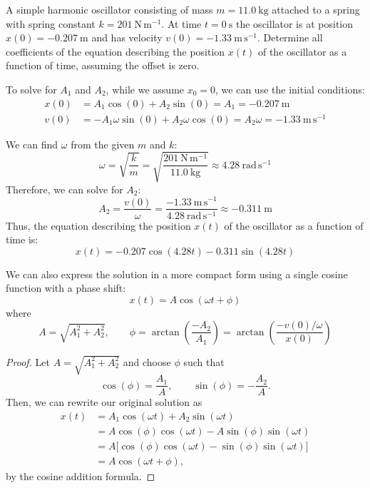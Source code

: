 \documentclass[11pt]{report}
\begin{document}
\begin{example}
    A simple harmonic oscillator consisting of mass \(m = 11.0\ \mathrm{kg}\) attached to a spring with spring constant \(k = 201\ \mathrm{N\,m^{-1}}\). At time \(t=0\ \mathrm{s}\) the oscillator is at position \(x(0) = -0.207\ \mathrm{m}\) and has velocity \(v(0) = -1.33\ \mathrm{m\,s^{-1}}\). Determine all coefficients of the equation describing the position \(x(t)\) of the oscillator as a function of time, assuming the offset is zero. 

    To solve for $A_1$ and $A_2$, while we assume $x_0 = 0$, we can use the initial conditions:
    \begin{align*}
        x(0) &= A_1 \cos(0) + A_2 \sin(0) = A_1 = -0.207\ \mathrm{m} \\
        v(0) &= -A_1 \omega \sin(0) + A_2 \omega \cos(0) = A_2 \omega = -1.33\ \mathrm{m\,s^{-1}}
    \end{align*}

    We can find $\omega$ from the given $m$ and $k$:
    $$
    \omega = \sqrt{\frac{k}{m}} = \sqrt{\frac{201\ \mathrm{N\,m^{-1}}}{11.0\ \mathrm{kg}}} \approx 4.28\ \mathrm{rad\,s^{-1}}
    $$
    Therefore, we can solve for $A_2$:
    $$
    A_2 = \frac{v(0)}{\omega} = \frac{-1.33\ \mathrm{m\,s^{-1}}}{4.28\ \mathrm{rad\,s^{-1}}} \approx -0.311\ \mathrm{m}
    $$
    Thus, the equation describing the position \(x(t)\) of the oscillator as a function of time is:
    $$
    x(t) = -0.207 \cos(4.28 t) - 0.311 \sin(4.28 t)
    $$
\end{example}
\begin{theorem}
We can also express the solution in a more compact form using a single cosine function with a phase shift:
$$
    x(t) = A \cos(\omega t + \phi)
$$
where
$$
        A = \sqrt{A_1^2 + A_2^2}, \qquad
        \phi = \arctan\!\left(\frac{-A_2}{A_1}\right) 
              = \arctan\!\left(\frac{-v(0)/\omega}{x(0)}\right)
$$
\end{theorem}

\begin{proof}
Let $A = \sqrt{A_1^2 + A_2^2}$ and choose $\phi$ such that 
\[
\cos(\phi) = \frac{A_1}{A}, \qquad \sin(\phi) = -\frac{A_2}{A}.
\]
Then, we can rewrite our original solution as
\begin{align*}
    x(t) &= A_1 \cos(\omega t) + A_2 \sin(\omega t) \\
         &= A \cos(\phi) \cos(\omega t) - A \sin(\phi) \sin(\omega t) \\
         &= A \big[\cos(\phi)\cos(\omega t) - \sin(\phi)\sin(\omega t)\big] \\ 
         &= A \cos(\omega t + \phi),
\end{align*}
by the cosine addition formula.
\end{proof}
\end{document}
